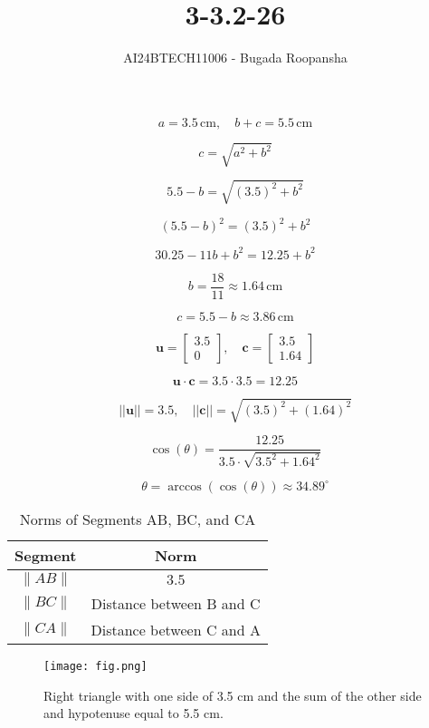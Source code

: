 \documentclass[journal]{IEEEtran}
\begin{document}

\vspace{3cm}

\title{3-3.2-26}
\author{AI24BTECH11006 - Bugada Roopansha}
{\let\newpage\relax\maketitle}  %

\renewcommand{\thefigure}{\theenumi}
\renewcommand{\thetable}{\theenumi}
\setlength{\intextsep}{10pt} %

\[
a = 3.5 \, \text{cm}, \quad b + c = 5.5 \, \text{cm}
\]

\[
c = \sqrt{a^2 + b^2}
\]

\[
5.5 - b = \sqrt{(3.5)^2 + b^2}
\]

\[
(5.5 - b)^2 = (3.5)^2 + b^2
\]

\[
30.25 - 11b + b^2 = 12.25 + b^2
\]

\[
b = \frac{18}{11} \approx 1.64 \, \text{cm}
\]

\[
c = 5.5 - b \approx 3.86 \, \text{cm}
\]

\[
\mathbf{u} = \begin{bmatrix} 3.5 \\ 0 \end{bmatrix}, \quad \mathbf{c} = \begin{bmatrix} 3.5 \\ 1.64 \end{bmatrix}
\]

\[
\mathbf{u} \cdot \mathbf{c} = 3.5 \cdot 3.5 = 12.25
\]

\[
||\mathbf{u}|| = 3.5, \quad ||\mathbf{c}|| = \sqrt{(3.5)^2 + (1.64)^2}
\]

\[
\cos(\theta) = \frac{12.25}{3.5 \cdot \sqrt{3.5^2 + 1.64^2}}
\]

\[
\theta = \arccos\left(\cos(\theta)\right) \approx 34.89^\circ
\]

\begin{table}[h!]
\centering
\begin{tabular}{|c|c|}
\hline
\textbf{Segment} & \textbf{Norm} \\ \hline
\( \| AB \| \) & $3.5$ \\ \hline
\( \| BC \| \) & Distance between B and C \\ \hline
\( \| CA \| \) & Distance between C and A \\ \hline
\end{tabular}
\caption{Norms of Segments AB, BC, and CA}
\end{table}
\begin{figure}[h!]
\centering
\texttt{[image: fig.png]} %
\caption{Right triangle with one side of 3.5 cm and the sum of the other side and hypotenuse equal to 5.5 cm.}
\end{figure}
\end{document}
